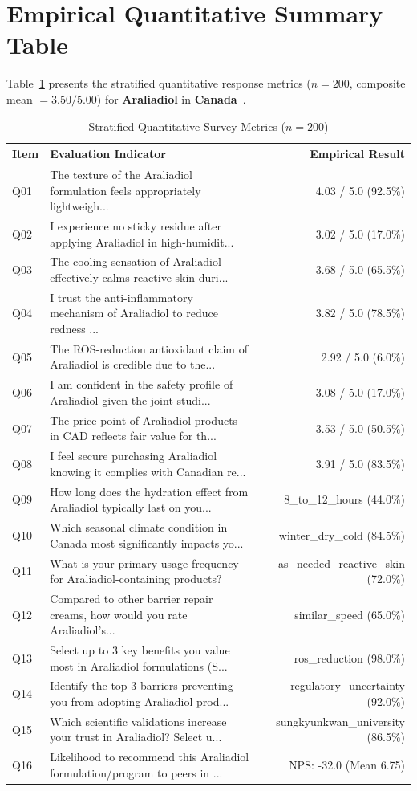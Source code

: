 \documentclass[10pt,twocolumn,a4paper]{article}
\begin{document}
\section{Empirical Quantitative Summary Table}
Table~\ref{tab:metrics} presents the stratified quantitative response metrics ($n = 200$, composite mean $= 3.50/5.00$) for \textbf{Araliadiol} in \textbf{Canada}~\cite{ref_kaggle_doi,ref_hf_doi}.

\begin{table}[t]
\centering
\caption{Stratified Quantitative Survey Metrics ($n = 200$)}
\label{tab:metrics}
\small
\begin{tabularx}{\textwidth}{l X r}
\toprule
\textbf{Item} & \textbf{Evaluation Indicator} & \textbf{Empirical Result} \\
\midrule
Q01 & The texture of the Araliadiol formulation feels appropriately lightweigh... & 4.03 / 5.0 (92.5\%) \\
Q02 & I experience no sticky residue after applying Araliadiol in high-humidit... & 3.02 / 5.0 (17.0\%) \\
Q03 & The cooling sensation of Araliadiol effectively calms reactive skin duri... & 3.68 / 5.0 (65.5\%) \\
Q04 & I trust the anti-inflammatory mechanism of Araliadiol to reduce redness ... & 3.82 / 5.0 (78.5\%) \\
Q05 & The ROS-reduction antioxidant claim of Araliadiol is credible due to the... & 2.92 / 5.0 (6.0\%) \\
Q06 & I am confident in the safety profile of Araliadiol given the joint studi... & 3.08 / 5.0 (17.0\%) \\
Q07 & The price point of Araliadiol products in CAD reflects fair value for th... & 3.53 / 5.0 (50.5\%) \\
Q08 & I feel secure purchasing Araliadiol knowing it complies with Canadian re... & 3.91 / 5.0 (83.5\%) \\
Q09 & How long does the hydration effect from Araliadiol typically last on you... & 8\_to\_12\_hours (44.0\%) \\
Q10 & Which seasonal climate condition in Canada most significantly impacts yo... & winter\_dry\_cold (84.5\%) \\
Q11 & What is your primary usage frequency for Araliadiol-containing products? & as\_needed\_reactive\_skin (72.0\%) \\
Q12 & Compared to other barrier repair creams, how would you rate Araliadiol's... & similar\_speed (65.0\%) \\
Q13 & Select up to 3 key benefits you value most in Araliadiol formulations (S... & ros\_reduction (98.0\%) \\
Q14 & Identify the top 3 barriers preventing you from adopting Araliadiol prod... & regulatory\_uncertainty (92.0\%) \\
Q15 & Which scientific validations increase your trust in Araliadiol? Select u... & sungkyunkwan\_university (86.5\%) \\
Q16 & Likelihood to recommend this Araliadiol formulation/program to peers in ... & NPS: -32.0 (Mean 6.75) \\
\bottomrule
\end{tabularx}
\end{table}
\end{document}
